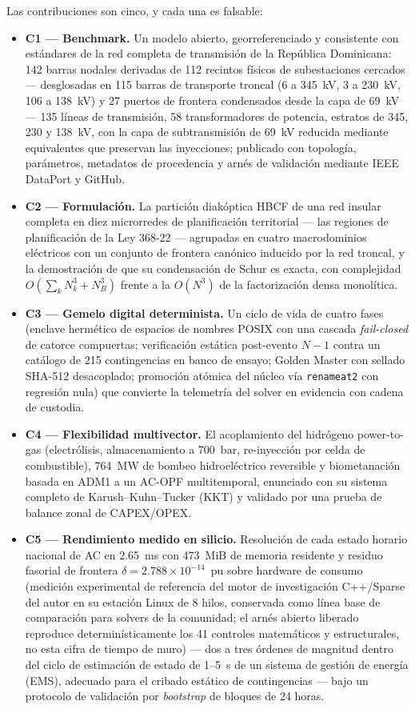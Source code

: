 Las contribuciones son cinco, y cada una es falsable:
\begin{itemize}
\item \textbf{C1 --- Benchmark.} Un modelo abierto, georreferenciado y consistente con estándares de la red completa de transmisión de la República Dominicana: 142 barras nodales derivadas de 112 recintos físicos de subestaciones cercados --- desglosadas en 115 barras de transporte troncal (6 a 345~kV, 3 a 230~kV, 106 a 138~kV) y 27 puertos de frontera condensados desde la capa de 69~kV --- 135 líneas de transmisión, 58 transformadores de potencia, estratos de 345, 230 y 138~kV, con la capa de subtransmisión de 69~kV reducida mediante equivalentes que preservan las inyecciones; publicado con topología, parámetros, metadatos de procedencia y arnés de validación mediante IEEE DataPort y GitHub.
\item \textbf{C2 --- Formulación.} La partición diakóptica HBCF de una red insular completa en diez microrredes de planificación territorial --- las regiones de planificación de la Ley 368-22 --- agrupadas en cuatro macrodominios eléctricos con un conjunto de frontera canónico inducido por la red troncal, y la demostración de que su condensación de Schur es exacta, con complejidad $O(\sum_k N_k^3 + N_B^3)$ frente a la $O(N^3)$ de la factorización densa monolítica.
\item \textbf{C3 --- Gemelo digital determinista.} Un ciclo de vida de cuatro fases (enclave hermético de espacios de nombres POSIX con una cascada \emph{fail-closed} de catorce compuertas; verificación estática post-evento $N-1$ contra un catálogo de 215 contingencias en banco de ensayo; Golden Master con sellado SHA-512 desacoplado; promoción atómica del núcleo vía \texttt{renameat2} con regresión nula) que convierte la telemetría del solver en evidencia con cadena de custodia.
\item \textbf{C4 --- Flexibilidad multivector.} El acoplamiento del hidrógeno power-to-gas (electrólisis, almacenamiento a 700~bar, re-inyección por celda de combustible), 764~MW de bombeo hidroeléctrico reversible y biometanación basada en ADM1 a un AC-OPF multitemporal, enunciado con su sistema completo de Karush--Kuhn--Tucker (KKT) y validado por una prueba de balance zonal de CAPEX/OPEX.
\item \textbf{C5 --- Rendimiento medido en silicio.} Resolución de cada estado horario nacional de AC en 2.65~ms con 473~MiB de memoria residente y residuo fasorial de frontera $\delta = 2.788 \times 10^{-14}$~pu sobre hardware de consumo (medición experimental de referencia del motor de investigación C++/Sparse del autor en su estación Linux de 8 hilos, conservada como línea base de comparación para solvers de la comunidad; el arnés abierto liberado reproduce determinísticamente los 41 controles matemáticos y estructurales, no esta cifra de tiempo de muro) --- dos a tres órdenes de magnitud dentro del ciclo de estimación de estado de 1--5~s de un sistema de gestión de energía (EMS), adecuado para el cribado estático de contingencias --- bajo un protocolo de validación por \emph{bootstrap} de bloques de 24 horas.
\end{itemize}


